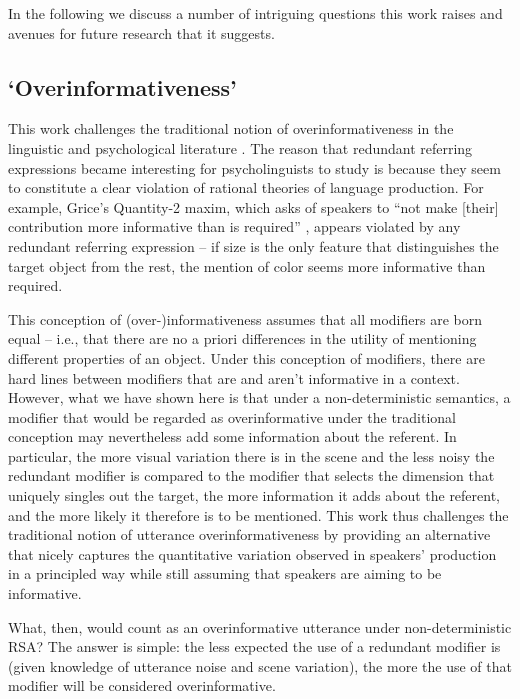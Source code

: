 \documentclass[11pt]{article}
\begin{document}
In the following we discuss a number of intriguing questions this work raises and avenues for future research that it suggests.

\subsection{`Overinformativeness'}

This work challenges the traditional notion of overinformativeness in the linguistic and psychological literature \cite{engelhardt2006a, others}. The reason that redundant referring expressions became interesting for psycholinguists to study is because they seem to constitute a clear violation of rational theories of language production. For example, Grice's Quantity-2 maxim, which asks of speakers to ``not make [their] contribution more informative than is required'' \cite{grice1975}, appears violated by any redundant referring expression -- if size is the only feature that distinguishes the target object from the rest, the mention of color seems more informative than required. 

This conception of (over-)informativeness assumes that all modifiers are born equal -- i.e., that there are no a priori differences in the utility of mentioning different properties of an object. Under this conception of modifiers, there are hard lines between modifiers that are and aren't informative in a context. However, what we have shown here is that under a non-deterministic semantics, a modifier that would be regarded as overinformative under the traditional conception may nevertheless add some information about the referent. In particular, the more visual variation there is in the scene and the less noisy the redundant modifier is compared to the modifier that selects the  dimension that uniquely singles out the target, the more information it adds about the referent, and the more likely it therefore is to be mentioned. This work thus challenges the traditional notion of utterance overinformativeness by providing an alternative that nicely captures the quantitative variation observed in speakers' production in a principled way while still assuming that speakers are aiming to be informative.


What, then, would count as an overinformative utterance under non-deterministic RSA? The answer is simple: the less expected the use of a redundant modifier is (given knowledge of utterance noise and scene variation), the more the use of that modifier will be considered overinformative. 
\end{document}

